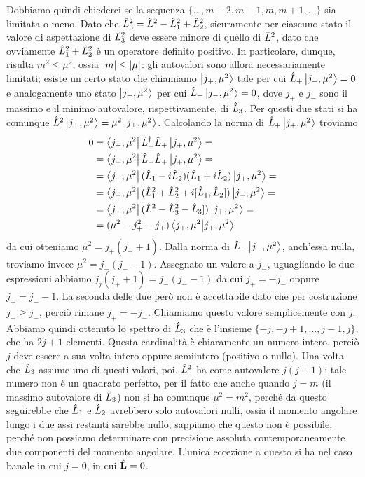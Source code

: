 Dobbiamo quindi chiederci se la sequenza $\{\dots,m-2,m-1,m,m+1,\dots\}$ sia limitata o meno.
Dato che $\hat{L}_3^2=\hat{L}^2-\hat{L}_1^2+\hat{L}_2^2$, sicuramente per ciascuno stato il valore di aspettazione di $\hat{L}_3^2$ deve essere minore di quello di $\hat{L}^2$, dato che ovviamente $\hat{L}_1^2+\hat{L}_2^2$ è un operatore definito positivo.
In particolare, dunque, risulta $m^2\le\mu^2$, ossia $\left|{m}\right|\le\left|{\mu}\right|$: gli autovalori sono allora necessariamente limitati; esiste un certo stato che chiamiamo $\left|{j_+,\mu^2}\right\rangle$ tale per cui $\hat{L}_+\left|{j_+,\mu^2}\right\rangle=0$ e analogamente uno stato $\left|{j_-,\mu^2}\right\rangle$ per cui $\hat{L}_-\left|{j_-,\mu^2}\right\rangle=0$, dove $j_+$ e $j_-$ sono il massimo e il minimo autovalore, rispettivamente, di $\hat{L}_3$.
Per questi due stati si ha comunque $\hat{L}^2\left|{j_\pm,\mu^2}\right\rangle=\mu^2\left|{j_\pm,\mu^2}\right\rangle$.
Calcolando la norma di $\hat{L}_+\left|{j_+,\mu^2}\right\rangle$ troviamo
\begin{equation}
	\begin{split}
		0&=\left\langle{j_+,\mu^2}\right|{\hat{L}_+}^\dagger\hat{L}_+\left|{j_+,\mu^2}\right\rangle=\\
		&=\left\langle{j_+,\mu^2}\right|\hat{L}_-\hat{L}_+\left|{j_+,\mu^2}\right\rangle=\\
		&=\left\langle{j_+,\mu^2}\right|(\hat{L}_1-i\hat{L}_2)(\hat{L}_1+i\hat{L}_2)\left|{j_+,\mu^2}\right\rangle=\\
		&=\left\langle{j_+,\mu^2}\right|(\hat{L}_1^2+\hat{L}_2^2+i[\hat{L}_1,\hat{L}_2])\left|{j_+,\mu^2}\right\rangle=\\
		&=\left\langle{j_+,\mu^2}\right|(\hat{L}^2-\hat{L}_3^2-\hat{L}_3])\left|{j_+,\mu^2}\right\rangle=\\
		&=(\mu^2-j_+^2-j_+)\left\langle{j_+,\mu^2}\middle|{j_+,\mu^2}\right\rangle
	\end{split}
\end{equation}
da cui otteniamo $\mu^2=j_+(j_++1)$.
Dalla norma di $\hat{L}_-\left|{j_-,\mu^2}\right\rangle$, anch'essa nulla, troviamo invece $\mu^2=j_-(j_--1)$.
Assegnato un valore a $j_-$, uguagliando le due espressioni abbiamo $j_j(j_++1)=j_-(j_--1)$ da cui $j_+=-j_-$ oppure $j_+=j_--1$.
La seconda delle due però non è accettabile dato che per costruzione $j_+\ge j_-$, perciò rimane $j_+=-j_-$.
Chiamiamo questo valore semplicemente con $j$.
Abbiamo quindi ottenuto lo spettro di $\hat{L}_3$ che è l'insieme $\{-j,-j+1,\dots,j-1,j\}$, che ha $2j+1$ elementi.
Questa cardinalità è chiaramente un numero intero, perciò $j$ deve essere a sua volta intero oppure semiintero (positivo o nullo).
Una volta che $\hat{L}_3$ assume uno di questi valori, poi, $\hat{L}^2$ ha come autovalore $j(j+1)$: tale numero non è un quadrato perfetto, per il fatto che anche quando $j=m$ (il massimo autovalore di $\hat{L}_3$) non si ha comunque $\mu^2=m^2$, perch\'e da questo seguirebbe che $\hat{L}_1$ e $\hat{L}_2$ avrebbero solo autovalori nulli, ossia il momento angolare lungo i due assi restanti sarebbe nullo; sappiamo che questo non è possibile, perch\'e non possiamo determinare con precisione assoluta contemporaneamente due componenti del momento angolare.
L'unica eccezione a questo si ha nel caso banale in cui $j=0$, in cui $\hat{\mathbf{L}}=0$.

